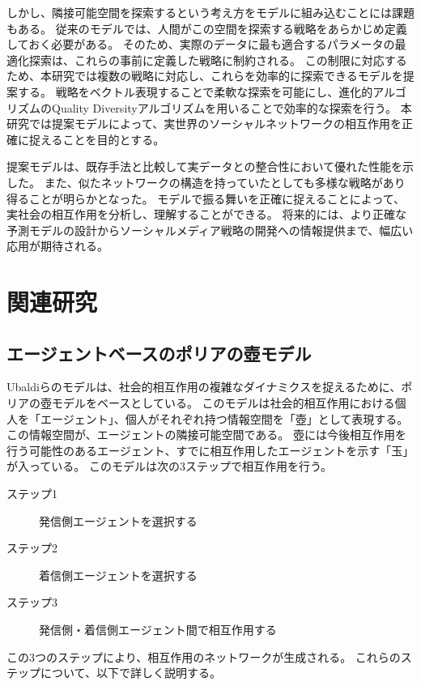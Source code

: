 \documentclass[uplatex,11pt,openany]{ujreport}
\begin{document}
    しかし、隣接可能空間を探索するという考え方をモデルに組み込むことには課題もある。
    従来のモデルでは、人間がこの空間を探索する戦略をあらかじめ定義しておく必要がある。
    そのため、実際のデータに最も適合するパラメータの最適化探索は、これらの事前に定義した戦略に制約される\cite{sudaExplorationExploitationAdjacent2022,sudaAgentbasedModelUsing2022, ubaldiEmergenceEvolutionSocial2021}。
    この制限に対応するため、本研究では複数の戦略に対応し、これらを効率的に探索できるモデルを提案する。
    戦略をベクトル表現することで柔軟な探索を可能にし、進化的アルゴリズムのQuality Diversityアルゴリズムを用いることで効率的な探索を行う。
    本研究では提案モデルによって、実世界のソーシャルネットワークの相互作用を正確に捉えることを目的とする。

    提案モデルは、既存手法と比較して実データとの整合性において優れた性能を示した。
    また、似たネットワークの構造を持っていたとしても多様な戦略があり得ることが明らかとなった。
    モデルで振る舞いを正確に捉えることによって、実社会の相互作用を分析し、理解することができる。
    将来的には、より正確な予測モデルの設計からソーシャルメディア戦略の開発への情報提供まで、幅広い応用が期待される。





\chapter{関連研究}
    \section{エージェントベースのポリアの壺モデル}
    Ubaldiらのモデルは、社会的相互作用の複雑なダイナミクスを捉えるために、ポリアの壺モデルをベースとしている\cite{ubaldiEmergenceEvolutionSocial2021}。
    このモデルは社会的相互作用における個人を「エージェント」、個人がそれぞれ持つ情報空間を「壺」として表現する。
    この情報空間が、エージェントの隣接可能空間である。
    壺には今後相互作用を行う可能性のあるエージェント、すでに相互作用したエージェントを示す「玉」が入っている。
    このモデルは次の3ステップで相互作用を行う。
        \begin{description}
            \item[ステップ1] 発信側エージェントを選択する
            \item[ステップ2] 着信側エージェントを選択する
            \item[ステップ3] 発信側・着信側エージェント間で相互作用する
        \end{description}
    この3つのステップにより、相互作用のネットワークが生成される。
    これらのステップについて、以下で詳しく説明する。
\end{document}
